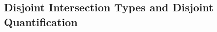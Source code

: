 \begin{comment}
\noindent In contrast to Scala's term-level \lstinline{with}
construct, the operator \lstinline{,,} allows two arbitrary values \lstinline{x}
and \lstinline{y} to be merged. The resulting type is a \emph{disjoint}
intersection of the types of  \lstinline{x}
and \lstinline{y} (\lstinline{A & B} in this case).



\paragraph{Incoherence and Parametric Polymorphism}
We can define a \code{fst} function that extracts the first item of a merged value:
\[
\code{fst} \ \alpha \ \beta \ (x : \alpha \inter \beta) = \app {(\lam y \alpha y)} x
\]
What should be the result of this program?
\begin{lstlisting}
fst Int Int (1,,2)
\end{lstlisting}

Then we have the following equational reasoning:
\begin{lstlisting}
fst Int Int (1,,2) => (\(y : Int). y) (1,,2)
\end{lstlisting}
If we favour the second item, the program seems to evaluate to $2$. But in
reality, the result is $2$. No matter we favour the first or the second item,
we can always construct a program such that for that program, equational
reasoning is broken.

Therefore, we require that the two types of an intersection must be not
overlapping, or \emph{disjoint}, and add this requirement to the well-formedness of types.

A well-formed type is such that given any query type,
it is always clear which subpart the query is referring to.
In terms of rules, this notion of well-formedness is almost the same as the one in System $F$
except for intersection types we require the two components to be disjoint.

With parametric polymorphism, disjointness is harder to determine due to type variables.
Consider this program:
\[
\blam \alpha {\lam x {\alpha \inter \tyint} x}
\]
$x$ in the body is of type $\alpha \inter \tyint$ and if $\alpha$ and $\tyint$ are
disjoint depends on the instantiation of $\alpha$.
\end{comment}

\subsection{Disjoint Intersection Types and Disjoint Quantification}

